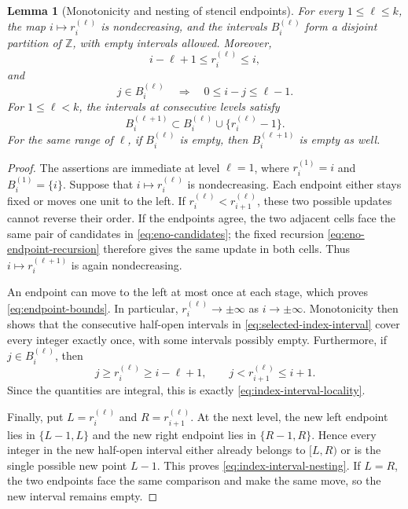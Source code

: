 \documentclass[11pt]{amsart}
\theoremstyle{plain}
\newtheorem{lemma}[theorem]{Lemma}
\theoremstyle{definition}
\theoremstyle{remark}
\numberwithin{equation}{section}
\theoremstyle{plain}
\begin{document}
\begin{lemma}[Monotonicity and nesting of stencil endpoints]
	\label{lem:endpoint-partition}
	For every $1\le\ell\le k$, the map
	$i\mapsto r_i^{(\ell)}$ is nondecreasing, and
	the intervals $B_i^{(\ell)}$ form a disjoint partition of $\mathbb Z$, with
	empty intervals allowed.  Moreover,
	\begin{equation}\label{eq:endpoint-bounds}
		i-\ell+1\le r_i^{(\ell)}\le i,
	\end{equation}
	and
	\begin{equation}\label{eq:index-interval-locality}
		j\in B_i^{(\ell)}
		\quad\Longrightarrow\quad
		0\le i-j\le\ell-1.
	\end{equation}
	For $1\le\ell<k$, the intervals at consecutive levels satisfy
	\begin{equation}\label{eq:index-interval-nesting}
		B_i^{(\ell+1)}
		\subset B_i^{(\ell)}\cup\{r_i^{(\ell)}-1\}.
	\end{equation}
	For the same range of $\ell$, if $B_i^{(\ell)}$ is empty, then
	$B_i^{(\ell+1)}$ is empty as well.
\end{lemma}

\begin{proof}
	The assertions are immediate at level $\ell=1$, where
	$r_i^{(1)}=i$ and $B_i^{(1)}=\{i\}$.  Suppose that
	$i\mapsto r_i^{(\ell)}$ is nondecreasing.  Each endpoint either stays fixed
	or moves one unit to the left.  If
	$r_i^{(\ell)}<r_{i+1}^{(\ell)}$, these two possible updates cannot reverse
	their order.  If the endpoints agree, the two adjacent cells face the same
	pair of candidates in \eqref{eq:eno-candidates}; the fixed recursion
	\eqref{eq:eno-endpoint-recursion} therefore gives the same update in both
	cells.  Thus $i\mapsto r_i^{(\ell+1)}$ is again nondecreasing.
	
	An endpoint can move to the left at most once at each stage, which proves
	\eqref{eq:endpoint-bounds}.  In particular,
	$r_i^{(\ell)}\to\pm\infty$ as $i\to\pm\infty$.  Monotonicity then shows that
	the consecutive half-open intervals in \eqref{eq:selected-index-interval}
	cover every integer exactly once, with some intervals possibly empty.
	Furthermore, if $j\in B_i^{(\ell)}$, then
	\[
	j\ge r_i^{(\ell)}\ge i-\ell+1,
	\qquad
	j<r_{i+1}^{(\ell)}\le i+1.
	\]
	Since the quantities are integral, this is exactly
	\eqref{eq:index-interval-locality}.
	
	Finally, put $L=r_i^{(\ell)}$ and $R=r_{i+1}^{(\ell)}$.  At the next level,
	the new left endpoint lies in $\{L-1,L\}$ and the new right endpoint lies in
	$\{R-1,R\}$.  Hence every integer in the new half-open interval either
	already belongs to $[L,R)$ or is the single possible new point $L-1$.  This
	proves \eqref{eq:index-interval-nesting}.  If $L=R$, the two endpoints face
	the same comparison and make the same move, so the new interval remains
	empty.
\end{proof}
\end{document}
